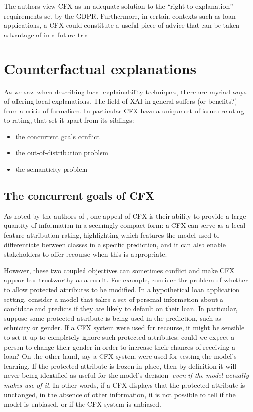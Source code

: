 \documentclass[../main.tex]{subfiles}
\begin{document}
The authors view CFX as an adequate solution to the ``right to explanation'' requirements set by the GDPR. Furthermore, in certain contexts such as loan applications, a CFX could constitute a useful piece of advice that can be taken advantage of in a future trial. \citenote{}

\section{Counterfactual explanations}

As we saw when describing local explainability techniques, there are myriad ways of offering local explanations.
The field of XAI in general suffers (or benefits?) from a crisis of formalism.
In particular CFX have a unique set of issues relating to rating, that set it apart from its siblings:
\begin{itemize}
    \item the concurrent goals conflict
    \item the out-of-distribution problem
    \item the semanticity problem
\end{itemize}

\subsection{The concurrent goals of CFX}

As noted by the authors of \cite{wachterCounterfactual2017}, one appeal of CFX is their ability to provide a large quantity of information in a seemingly compact form:
a CFX can serve as a local feature attribution rating, highlighting which features the model used to differentiate between classes in a specific prediction, and it can also enable stakeholders to offer recourse when this is appropriate.

However, these two coupled objectives can sometimes conflict and make CFX appear less trustworthy as a result.
For example, consider the problem of whether to allow protected attributes to be modified.
In a hypothetical loan application setting, consider a model that takes a set of personal information about a candidate and predicts if they are likely to default on their loan.
In particular, suppose some protected attribute is being used in the prediction, such as ethnicity or gender.
If a CFX system were used for recourse, it might be sensible to set it up to completely ignore such protected attributes: could we expect a person to change their gender in order to increase their chances of receiving a loan?
On the other hand, say a CFX system were used for testing the model's learning. If the protected attribute is frozen in place, then by definition it will never being identified as useful for the model's decision, \emph{even if the model actually makes use of it}.
In other words, if a CFX displays that the protected attribute is unchanged, in the absence of other information, it is not possible to tell if the model is unbiased, or if the CFX system is unbiased.
\end{document}
